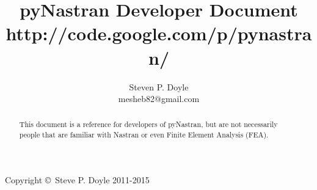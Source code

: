 \documentclass[a4paper,12pt]{article}
\begin{document}
\title{pyNastran Developer Document \\
\small http://code.google.com/p/pynastran/ }
\author{Steven P. Doyle\\
{\small mesheb82@gmail.com}
}

\maketitle

\begin{abstract}
This document is a reference for developers of pyNastran, but are not
necessarily people that are familiar with Nastran or even Finite Element
Analysis (FEA).
\end{abstract}

Copyright \copyright\ Steve P. Doyle 2011-2015
\newpage

\tableofcontents
\newpage


\newpage

%





%
%
%
%

%
%
\end{document}
